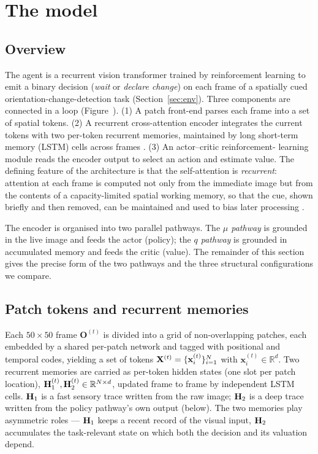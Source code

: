 \section{The model}
\label{sec:model}

\subsection{Overview}
The agent is a recurrent vision transformer trained by reinforcement learning to
emit a binary decision (\emph{wait} or \emph{declare change}) on each frame of a
spatially cued orientation-change-detection task (Section~\ref{sec:env}). Three
components are connected in a loop (Figure~). (1) A patch
front-end parses each frame into a set of spatial tokens. (2) A recurrent
cross-attention encoder integrates the current tokens with two per-token recurrent
memories, maintained by long short-term memory (LSTM) cells across frames
\citep{hochreiter1997long, beck2024xlstm}. (3) An actor--critic reinforcement-
learning module reads the encoder output to select an action and estimate value.
The defining feature of the architecture is that the self-attention is
\emph{recurrent}: attention at each frame is computed not only from the immediate
image but from the contents of a capacity-limited spatial working memory, so that
the cue, shown briefly and then removed, can be maintained and used to bias later
processing \citep{awh2006interactions, panichello2021attvwm, knudsen2007fundamental}.

The encoder is organised into two parallel pathways. The \emph{$\mu$ pathway} is
grounded in the live image and feeds the actor (policy); the \emph{$q$ pathway} is
grounded in accumulated memory and feeds the critic (value). The remainder of this
section gives the precise form of the two pathways and the three structural
configurations we compare.

\subsection{Patch tokens and recurrent memories}
Each $50\times50$ frame $\mathbf{O}^{(t)}$ is divided into a grid of non-overlapping
patches, each embedded by a shared per-patch network and tagged with positional and
temporal codes, yielding a set of tokens
$\mathbf{X}^{(t)} = \{\mathbf{x}^{(t)}_i\}_{i=1}^{N}$ with $\mathbf{x}^{(t)}_i \in
\mathbb{R}^{d}$. Two recurrent memories are carried as per-token hidden states (one
slot per patch location), $\mathbf{H}_1^{(t)},\mathbf{H}_2^{(t)} \in \mathbb{R}^{N\times d}$,
updated frame to frame by independent LSTM cells. $\mathbf{H}_1$ is a fast sensory trace
written from the raw image; $\mathbf{H}_2$ is a deep trace written from the policy
pathway's own output (below). The two memories play asymmetric roles --- $\mathbf{H}_1$
keeps a recent record of the visual input, $\mathbf{H}_2$ accumulates the task-relevant
state on which both the decision and its valuation depend.

